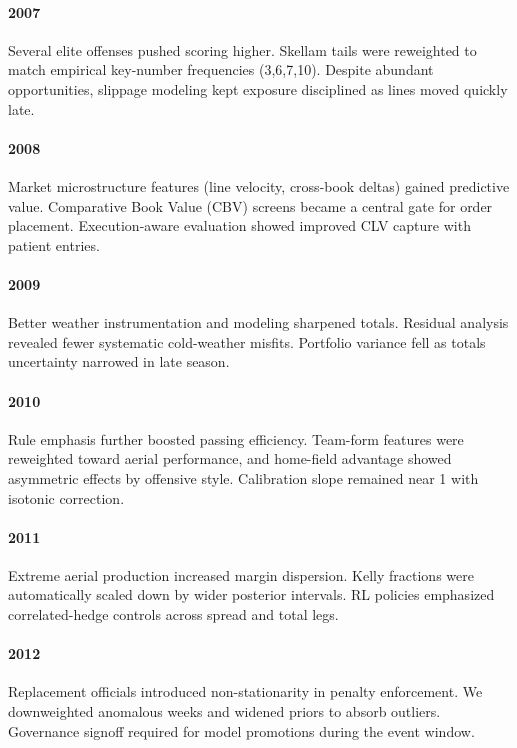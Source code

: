 \documentclass[12pt]{report}  %
\numberwithin{equation}{section}
\theoremstyle{plain}
\theoremstyle{definition}
\theoremstyle{remark}
\begin{document}
\paragraph{2007} Several elite offenses pushed scoring higher. Skellam tails were reweighted to match empirical key-number frequencies (3,6,7,10). Despite abundant opportunities, slippage modeling kept exposure disciplined as lines moved quickly late.

\paragraph{2008} Market microstructure features (line velocity, cross-book deltas) gained predictive value. Comparative Book Value (CBV) screens became a central gate for order placement. Execution-aware evaluation showed improved CLV capture with patient entries.

\paragraph{2009} Better weather instrumentation and modeling sharpened totals. Residual analysis revealed fewer systematic cold-weather misfits. Portfolio variance fell as totals uncertainty narrowed in late season.

\paragraph{2010} Rule emphasis further boosted passing efficiency. Team-form features were reweighted toward aerial performance, and home-field advantage showed asymmetric effects by offensive style. Calibration slope remained near 1 with isotonic correction.

\paragraph{2011} Extreme aerial production increased margin dispersion. Kelly fractions were automatically scaled down by wider posterior intervals. RL policies emphasized correlated-hedge controls across spread and total legs.

\paragraph{2012} Replacement officials introduced non-stationarity in penalty enforcement. We downweighted anomalous weeks and widened priors to absorb outliers. Governance signoff required for model promotions during the event window.
\end{document}
